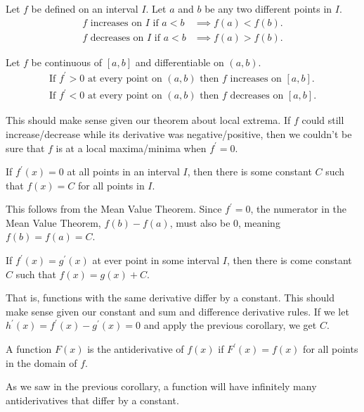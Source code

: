 \begin{definition}
	Let $f$ be defined on an interval $I$.
	Let $a$ and $b$ be any two different points in $I$.
	\begin{align*}
		\text{$f$ increases on $I$ if } a < b &\implies f(a) < f(b). \\
		\text{$f$ decreases on $I$ if } a < b &\implies f(a) > f(b).
	\end{align*}
\end{definition}

\begin{corollary}
	Let $f$ be continuous of $[a,b]$ and differentiable on $(a,b)$.
	\begin{align*}
		\text{If $f^\prime > 0$ at every point on $(a,b)$ then $f$ increases on $[a,b]$}. \\
		\text{If $f^\prime < 0$ at every point on $(a,b)$ then $f$ decreases on $[a,b]$}.
	\end{align*}
\end{corollary}

This should make sense given our theorem about local extrema.
If $f$ could still increase/decrease while its derivative was negative/positive, then we couldn't be sure that $f$ is at a local maxima/minima when $f^\prime=0$.

\begin{corollary}
	If $f^\prime(x) = 0$ at all points in an interval $I$, then there is some constant $C$ such that $f(x) = C$ for all points in $I$.
\end{corollary}

This follows from the Mean Value Theorem.
Since $f^\prime = 0$, the numerator in the Mean Value Theorem, $f(b) - f(a)$, must also be 0, meaning $f(b) = f(a) = C$.

\begin{corollary}
	If $f^\prime(x) = g^\prime(x)$ at ever point in some interval $I$, then there is come constant $C$ such that $f(x) = g(x) + C$.
\end{corollary}

That is, functions with the same derivative differ by a constant.
This should make sense given our constant and sum and difference derivative rules.
If we let $h^\prime(x) = f^\prime(x) - g^\prime(x) = 0$ and apply the previous corollary, we get $C$.

\begin{definition}
	A function $F(x)$ is the antiderivative	of $f(x)$ if $F^\prime(x) = f(x)$ for all points in the domain of $f$.
\end{definition}

As we saw in the previous corollary, a function will have infinitely many antiderivatives that differ by a constant.